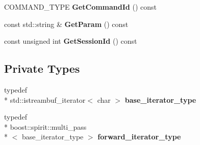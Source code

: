 \begin{DoxyCompactItemize}
\item 
\hypertarget{classhttp__server_1_1cRequest_a51ccd6f85abf1eb131bd3e2c10ad2f59}{C\-O\-M\-M\-A\-N\-D\-\_\-\-T\-Y\-P\-E {\bfseries Get\-Command\-Id} () const }\label{classhttp__server_1_1cRequest_a51ccd6f85abf1eb131bd3e2c10ad2f59}

\item 
\hypertarget{classhttp__server_1_1cRequest_a386946841d675edc9dbf5fd81d8de046}{const std\-::string \& {\bfseries Get\-Param} () const }\label{classhttp__server_1_1cRequest_a386946841d675edc9dbf5fd81d8de046}

\item 
\hypertarget{classhttp__server_1_1cRequest_ada8f38975ca9bb05bfe9b5b34aa985a5}{const unsigned int {\bfseries Get\-Session\-Id} () const }\label{classhttp__server_1_1cRequest_ada8f38975ca9bb05bfe9b5b34aa985a5}

\end{DoxyCompactItemize}
\subsection*{Private Types}
\begin{DoxyCompactItemize}
\item 
\hypertarget{classhttp__server_1_1cRequest_ab55878881ea0fad5b7801a7d3e67bc6f}{typedef \\*
std\-::istreambuf\-\_\-iterator$<$ char $>$ {\bfseries base\-\_\-iterator\-\_\-type}}\label{classhttp__server_1_1cRequest_ab55878881ea0fad5b7801a7d3e67bc6f}

\item 
\hypertarget{classhttp__server_1_1cRequest_a4c4ef5da2042acec5d8f9ff9f0a432c3}{typedef \\*
boost\-::spirit\-::multi\-\_\-pass\\*
$<$ base\-\_\-iterator\-\_\-type $>$ {\bfseries forward\-\_\-iterator\-\_\-type}}\label{classhttp__server_1_1cRequest_a4c4ef5da2042acec5d8f9ff9f0a432c3}

\end{DoxyCompactItemize}

